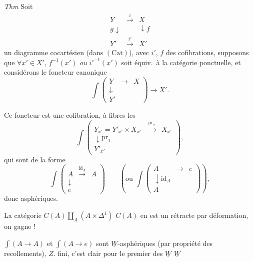 \documentclass[11pt,a4paper]{article}
\begin{document}
\emph{Thm} Soit
\[
  \begin{array}{ccc}
    Y & \xrightarrow{\ i\ } & X \\
    {\scriptstyle g}\downarrow & & \downarrow{\scriptstyle f} \\
    Y' & \xrightarrow{\ i'\ } & X'
  \end{array}
\]
un diagramme cocartésien (dans $(\mathrm{Cat})$), avec $i'$, $f$ des cofibrations,  supposons que $\forall x' \in X'$, $f^{-1}(x')$ \emph{ou} $i'^{-1}(x')$ soit équiv.\ à la catégorie ponctuelle, et considérons le foncteur canonique
\[
  \int \left(\begin{smallmatrix} Y & \to & X \\ \downarrow & & \\ Y' & & \end{smallmatrix}\right) \longrightarrow X' .
\]

Ce foncteur est une cofibration, à fibres les
\[
  \int \left(\begin{smallmatrix} Y_{x'} = Y'_{x'} \times X_{x'} & \xrightarrow{\ \mathrm{pr}_2\ } & X_{x'} \\ \downarrow{\scriptstyle \mathrm{pr}_1} & & \\ Y'_{x'} & & \end{smallmatrix}\right) ,
\]
qui sont \struck{\ill{}} de la forme
\[
  \int \left(\begin{smallmatrix} A & \xrightarrow{\mathrm{id}_A} & A \\ \downarrow & & \\ e & & \end{smallmatrix}\right)
  \qquad \left(\text{ou } \int \left(\begin{smallmatrix} A & \to & e \\ \downarrow{\scriptstyle \mathrm{id}_A} & & \\ A & & \end{smallmatrix}\right)\right),
\]
donc asphériques.

La catégorie \ill{} $C(A) \amalg_A (A \times \Delta^1)$  $C(A)$ en est un rétracte par déformation, on gagne !

 $\int (A \to A)$ et $\int (A \to e)$ sont $\underline{W}$-asphériques (par propriété des recollements), \ill{} $Z$. \ill{} fini, \ill{} c'est clair \ill{} pour le premier \ill{} des $\underline{W}$ \ill{} $\underline{W}$
\end{document}

